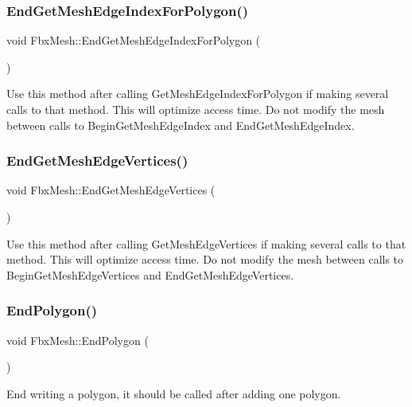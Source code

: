 \subsubsection{\texorpdfstring{End\+Get\+Mesh\+Edge\+Index\+For\+Polygon()}{EndGetMeshEdgeIndexForPolygon()}}
{\footnotesize\ttfamily void Fbx\+Mesh\+::\+End\+Get\+Mesh\+Edge\+Index\+For\+Polygon (\begin{DoxyParamCaption}{ }\end{DoxyParamCaption})}

Use this method after calling Get\+Mesh\+Edge\+Index\+For\+Polygon if making several calls to that method. This will optimize access time. Do not modify the mesh between calls to Begin\+Get\+Mesh\+Edge\+Index and End\+Get\+Mesh\+Edge\+Index. \mbox{\label{class_fbx_mesh_ad78469b758835d9ffda31a85df03f35c}} 
\subsubsection{\texorpdfstring{End\+Get\+Mesh\+Edge\+Vertices()}{EndGetMeshEdgeVertices()}}
{\footnotesize\ttfamily void Fbx\+Mesh\+::\+End\+Get\+Mesh\+Edge\+Vertices (\begin{DoxyParamCaption}{ }\end{DoxyParamCaption})}

Use this method after calling Get\+Mesh\+Edge\+Vertices if making several calls to that method. This will optimize access time. Do not modify the mesh between calls to Begin\+Get\+Mesh\+Edge\+Vertices and End\+Get\+Mesh\+Edge\+Vertices. \mbox{\label{class_fbx_mesh_a50b65ca7dca5c691bc50db6f55e0d0c9}} 
\subsubsection{\texorpdfstring{End\+Polygon()}{EndPolygon()}}
{\footnotesize\ttfamily void Fbx\+Mesh\+::\+End\+Polygon (\begin{DoxyParamCaption}{ }\end{DoxyParamCaption})}



End writing a polygon, it should be called after adding one polygon. 

